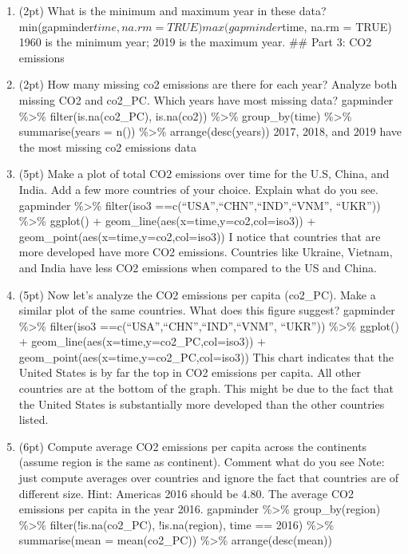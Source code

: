 \documentclass[]{article}
\providecommand{\tightlist}{%
  \setlength{\itemsep}{0pt}\setlength{\parskip}{0pt}}
\begin{document}
\begin{enumerate}
\def\labelenumi{\arabic{enumi}.}
\setcounter{enumi}{2}
\tightlist
\item
  (2pt) What is the minimum and maximum year in these data?
  min(gapminder\(time, na.rm = TRUE) max(gapminder\)time, na.rm = TRUE)
  1960 is the minimum year; 2019 is the maximum year. \#\# Part 3: CO2
  emissions
\item
  (2pt) How many missing co2 emissions are there for each year? Analyze
  both missing CO2 and co2\_PC. Which years have most missing data?
  gapminder \%\textgreater{}\% filter(is.na(co2\_PC), is.na(co2))
  \%\textgreater{}\% group\_by(time) \%\textgreater{}\% summarise(years
  = n()) \%\textgreater{}\% arrange(desc(years)) 2017, 2018, and 2019
  have the most missing co2 emissions data
\item
  (5pt) Make a plot of total CO2 emissions over time for the U.S, China,
  and India. Add a few more countries of your choice. Explain what do
  you see. gapminder \%\textgreater{}\% filter(iso3
  ==c(``USA'',``CHN'',``IND'',``VNM'', ``UKR'')) \%\textgreater{}\%
  ggplot() + geom\_line(aes(x=time,y=co2,col=iso3)) +
  geom\_point(aes(x=time,y=co2,col=iso3)) I notice that countries that
  are more developed have more CO2 emissions. Countries like Ukraine,
  Vietnam, and India have less CO2 emissions when compared to the US and
  China.
\item
  (5pt) Now let's analyze the CO2 emissions per capita (co2\_PC). Make a
  similar plot of the same countries. What does this figure suggest?
  gapminder \%\textgreater{}\% filter(iso3
  ==c(``USA'',``CHN'',``IND'',``VNM'', ``UKR'')) \%\textgreater{}\%
  ggplot() + geom\_line(aes(x=time,y=co2\_PC,col=iso3)) +
  geom\_point(aes(x=time,y=co2\_PC,col=iso3)) This chart indicates that
  the United States is by far the top in CO2 emissions per capita. All
  other countries are at the bottom of the graph. This might be due to
  the fact that the United States is substantially more developed than
  the other countries listed.
\item
  (6pt) Compute average CO2 emissions per capita across the continents
  (assume region is the same as continent). Comment what do you see
  Note: just compute averages over countries and ignore the fact that
  countries are of different size. Hint: Americas 2016 should be 4.80.
  The average CO2 emissions per capita in the year 2016. gapminder
  \%\textgreater{}\% group\_by(region) \%\textgreater{}\%
  filter(!is.na(co2\_PC), !is.na(region), time == 2016)
  \%\textgreater{}\% summarise(mean = mean(co2\_PC)) \%\textgreater{}\%
  arrange(desc(mean))
\end{enumerate}
\end{document}
